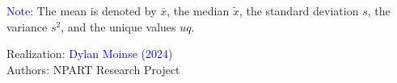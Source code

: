 \begin{table}[h!]
{\begin{tabular}{p{}p{}p{}p{}p{}p{}p{}}
    \end{tabular}}
    \caption*{}
    \vspace{5pt}
        \begin{flushleft}\scriptsize{
        \textcolor{blue}{Note:} The mean is denoted by \(\bar{x}\), the median \(\tilde{x}\), the standard deviation \(s\), the variance \(s^2\), and the unique values \(uq\).
        }\end{flushleft}
        \begin{flushright}\scriptsize
        Realization: \textcolor{blue}{Dylan Moinse (2024)}
        \\
        Authors: \acrshort{NPART} Research Project
        \end{flushright}
        \end{table}